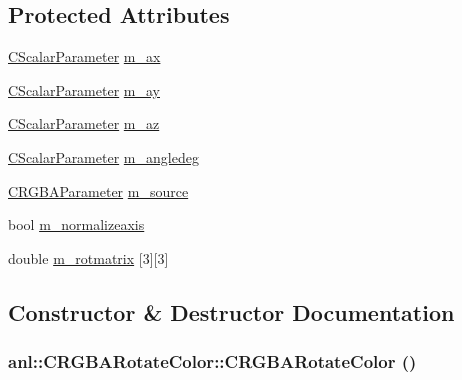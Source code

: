 \subsection*{Protected Attributes}
\begin{DoxyCompactItemize}
\item 
\hyperlink{classanl_1_1CScalarParameter}{CScalarParameter} \hyperlink{classanl_1_1CRGBARotateColor_affe1e203867cf042a5b040f64ca04f8d}{m\_\-ax}
\item 
\hyperlink{classanl_1_1CScalarParameter}{CScalarParameter} \hyperlink{classanl_1_1CRGBARotateColor_a6956bf565295950acd6b68df61892f53}{m\_\-ay}
\item 
\hyperlink{classanl_1_1CScalarParameter}{CScalarParameter} \hyperlink{classanl_1_1CRGBARotateColor_a1280cb06da2c8117e9533146268b94a0}{m\_\-az}
\item 
\hyperlink{classanl_1_1CScalarParameter}{CScalarParameter} \hyperlink{classanl_1_1CRGBARotateColor_a9f4cc07a843b1748569ddb49ff618eaf}{m\_\-angledeg}
\item 
\hyperlink{classanl_1_1CRGBAParameter}{CRGBAParameter} \hyperlink{classanl_1_1CRGBARotateColor_aa72ea19797c4f2328916d18308231844}{m\_\-source}
\item 
bool \hyperlink{classanl_1_1CRGBARotateColor_a6e423929825dd606c63ee095f5dbc399}{m\_\-normalizeaxis}
\item 
double \hyperlink{classanl_1_1CRGBARotateColor_a2b7efae7aa4391a13469356713ccea4d}{m\_\-rotmatrix} \mbox{[}3\mbox{]}\mbox{[}3\mbox{]}
\end{DoxyCompactItemize}


\subsection{Constructor \& Destructor Documentation}
\hypertarget{classanl_1_1CRGBARotateColor_a7ba7803c4753991a9d5ce7340e293ec7}{
\subsubsection[{CRGBARotateColor}]{\setlength{\rightskip}{0pt plus 5cm}anl::CRGBARotateColor::CRGBARotateColor ()}}
\label{classanl_1_1CRGBARotateColor_a7ba7803c4753991a9d5ce7340e293ec7}


